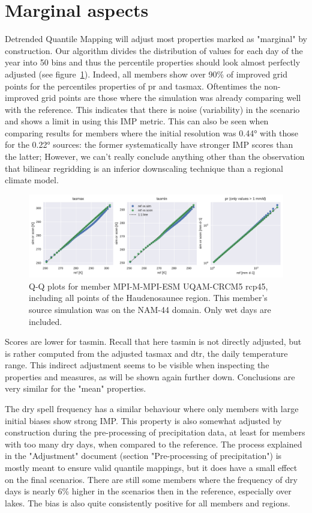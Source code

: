 \documentclass[letterpaper,10pt]{article}
\begin{document}
\section{Marginal aspects}\label{sec:marg}
Detrended Quantile Mapping will adjust most properties marked as "marginal" by construction.
Our algorithm divides the distribution of values for each day of the year into 50 bins and thus the percentile properties should look almost perfectly adjusted (see figure~\ref{fig:qq}).
Indeed, all members show over 90\% of improved grid points for the percentiles properties of pr and tasmax.
Oftentimes the non-improved grid points are those where the simulation was already comparing well with the reference.
This indicates that there is noise (variability) in the scenario and shows a limit in using this IMP metric.
This can also be seen when comparing results for members where the initial resolution was 0.44° with those for the 0.22° sources: the former systematically have stronger IMP scores than the latter;
However, we can't really conclude anything other than the observation that bilinear regridding is an inferior downscaling technique than a regional climate model.

\begin{figure}
\centering
\includegraphics[width=\textwidth]{../images/QQplots.pdf}
\caption{Q-Q plots for member MPI-M-MPI-ESM UQAM-CRCM5 rcp45, including all points of the Haudenosaunee region. This member's source simulation was on the NAM-44 domain. Only wet days are included.}\label{fig:qq}
\end{figure}

Scores are lower for tasmin. Recall that here tasmin is not directly adjusted, but is rather computed from the adjusted tasmax and dtr, the daily temperature range.
This indirect adjustment seems to be visible when inspecting the properties and measures, as will be shown again further down.
Conclusions are very similar for the "mean" properties.

The dry spell frequency has a similar behaviour where only members with large initial biases show strong IMP.
This property is also somewhat adjusted by construction during the pre-processing of precipitation data, at least for members with too many dry days, when compared to the reference.
The process explained in the "Adjustment" document (section "Pre-processing of precipitation") is mostly meant to ensure valid quantile mappings, but it does have a small effect on the final scenarios.
There are still some members where the frequency of dry days is nearly 6\% higher in the scenarios then in the reference, especially over lakes.
The bias is also quite consistently positive for all members and regions.
\end{document}
